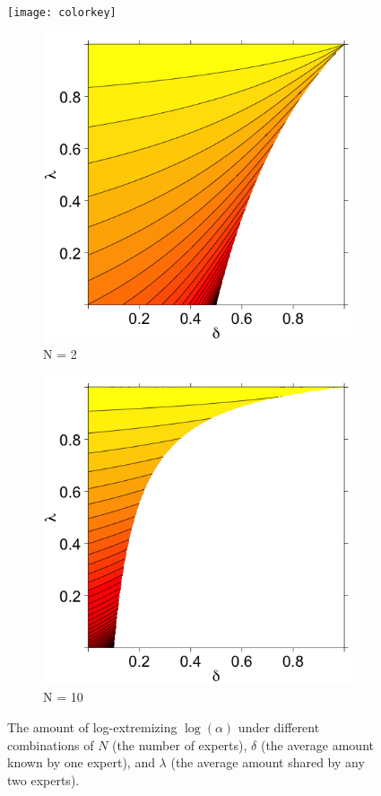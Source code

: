 \documentclass[11pt]{article}
\theoremstyle{definition}
\theoremstyle{definition}
\begin{document}
\begin{figure}[ht!]
\centering
\hspace*{1.2em} 	
\texttt{[image: colorkey]} 
    \centering
    \begin{subfigure}[b]{0.499\textwidth}
        \includegraphics[width=\textwidth]{ExtremeN2}
\caption{N = 2}	
\label{ExtremeN2}
    \end{subfigure}%
    \begin{subfigure}[b]{0.499\textwidth}
        \includegraphics[width=\textwidth]{ExtremeN10}
\caption{N = 10}
\label{ExtremeN10}
    \end{subfigure}
    \caption{ The amount of log-extremizing $\log(\alpha)$ under 
    different combinations of $N$ (the number of experts), 
    $\delta$ (the average amount known by one expert), and 
    $\lambda$ (the average amount shared by any two experts).}
    \label{Levelplots}
\end{figure}
\end{document}
